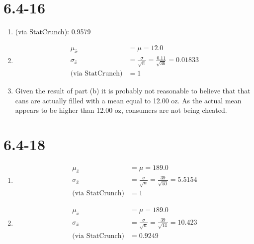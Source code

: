 \documentclass[12pt,fleqn]{article}
\newcommand{\chapter}{6.4}
\newcommand{\problem}[1]{\vspace{5ex}\section*{\chapter-#1}}
\begin{document}
\problem{16}
\begin{enumerate}[label=\alph*.]
\item (via StatCrunch): 0.9579
\item
  \begin{align*}
    \mu_{\bar{x}} &= \mu = 12.0 \\
    \sigma_{\bar{x}} &= \frac{\sigma}{\sqrt{n}} = \frac{0.11}{\sqrt{36}} = 0.01833 \\
    \text{(via StatCrunch)} &= 1
  \end{align*}

\item Given the result of part (b) it is probably not reasonable to believe that that cans are actually filled with a mean equal to 12.00 oz. As the actual mean appears to be higher than 12.00 oz, consumers are not being cheated.
\end{enumerate}


\problem{18}
\begin{enumerate}[label=\alph*.]
\item
  \begin{align*}
    \mu_{\bar{x}} &= \mu = 189.0 \\
    \sigma_{\bar{x}} &= \frac{\sigma}{\sqrt{n}} = \frac{39}{\sqrt{50}} = 5.5154 \\
    \text{(via StatCrunch)} &= 1
  \end{align*}

\item
  \begin{align*}
    \mu_{\bar{x}} &= \mu = 189.0 \\
    \sigma_{\bar{x}} &= \frac{\sigma}{\sqrt{n}} = \frac{39}{\sqrt{14}} = 10.423  \\
    \text{(via StatCrunch)} &= 0.9249
  \end{align*}
\end{enumerate}
\end{document}
